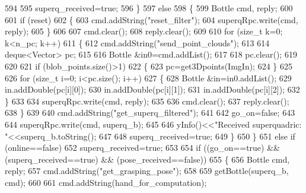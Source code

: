 \begin{DoxyCode}
594 
595                 superq\_received=\textcolor{keyword}{true};
596             \}
597             \textcolor{keywordflow}{else}
598             \{
599                 Bottle cmd, reply;
600 
601                 \textcolor{keywordflow}{if} (reset)
602                 \{
603                     cmd.addString(\textcolor{stringliteral}{"reset\_filter"});
604                     superqRpc.write(cmd, reply);
605                 \}
606 
607                 cmd.clear();
608                 reply.clear();
609 
610                 \textcolor{keywordflow}{for} (\textcolor{keywordtype}{size\_t} k=0; k<n\_pc; k++)
611                 \{
612                     cmd.addString(\textcolor{stringliteral}{"send\_point\_clouds"});
613 
614                     deque<Vector> pc;
615 
616                     Bottle &in0=cmd.addList();
617 
618                     pc.clear();
619 
620 
621                     \textcolor{keywordflow}{if} (blob\_points.size()>1)
622                     \{
623                         pc=get3Dpoints(ImgIn);
624                     \}
625 
626                     \textcolor{keywordflow}{for} (\textcolor{keywordtype}{size\_t} i=0; i<pc.size(); i++)
627                     \{
628                         Bottle &in=in0.addList();
629                         in.addDouble(pc[i][0]);
630                         in.addDouble(pc[i][1]);
631                         in.addDouble(pc[i][2]);                        
632                     \}
633 
634                     superqRpc.write(cmd, reply);
635 
636                     cmd.clear();
637                     reply.clear();
638                 \}
639 
640                 cmd.addString(\textcolor{stringliteral}{"get\_superq\_filtered"});
641 
642                 go\_on=\textcolor{keyword}{false};
643 
644                 superqRpc.write(cmd, superq\_b);
645 
646                 yInfo()<<\textcolor{stringliteral}{"Received superquadric: "}<<superq\_b.toString();
647 
648                 superq\_received=\textcolor{keyword}{true};
649             \}
650         \}
651         \textcolor{keywordflow}{else} \textcolor{keywordflow}{if} (online==\textcolor{keyword}{false})
652             superq\_received=\textcolor{keyword}{true};
653 
654         \textcolor{keywordflow}{if} ((go\_on==\textcolor{keyword}{true}) && (superq\_received==\textcolor{keyword}{true}) && (pose\_received==\textcolor{keyword}{false}))
655         \{
656             Bottle cmd, reply;
657             cmd.addString(\textcolor{stringliteral}{"get\_grasping\_pose"});
658 
659             getBottle(superq\_b, cmd);
660 
661             cmd.addString(hand\_for\_computation);

\end{DoxyCode}
